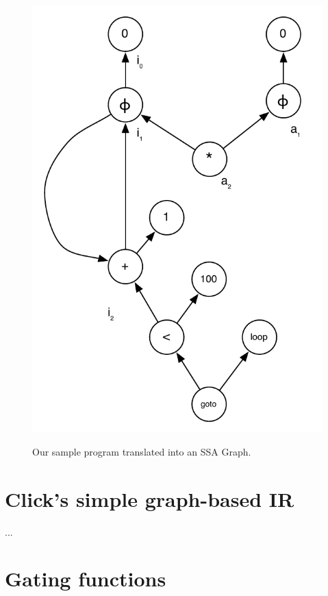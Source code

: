 \begin{figure}
\centering
\includegraphics[scale=0.5]{ssa-graph.pdf}
\label{fig: ssa-graph-example-graph}
\caption{Our sample program translated into an SSA Graph.}
\end{figure}

\section{Click's simple graph-based IR}

...


\section{Gating functions}


